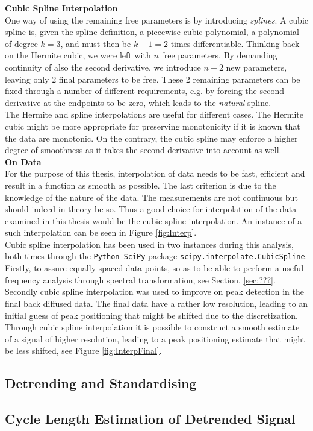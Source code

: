 \documentclass[../../CompleteThesis/Complete_1stDraft]{subfiles}
\begin{document}
\indent \textbf{Cubic Spline Interpolation}\\
One way of using the remaining free parameters is by introducing \textit{splines}. A cubic spline is, given the spline definition, a piecewise cubic polynomial, a polynomial of degree $k=3$, and must then be $k-1 = 2$ times differentiable. Thinking back on the Hermite cubic, we were left with $n$ free parameters. By demanding continuity of also the second derivative, we introduce $n-2$ new parameters, leaving only 2 final parameters to be free. These 2 remaining parameters can be fixed through a number of different requirements, e.g. by forcing the second derivative at the endpoints to be zero, which leads to the \textit{natural} spline.\\
The Hermite and spline interpolations are useful for different cases. The Hermite cubic might be more appropriate for preserving monotonicity if it is known that the data are monotonic. On the contrary, the cubic spline may enforce a higher degree of smoothness as it takes the second derivative into account as well.\\
\indent \textbf{On Data}\\
For the purpose of this thesis, interpolation of data needs to be fast, efficient and result in a function as smooth as possible. The last criterion is due to the knowledge of the nature of the data. The measurements are not continuous but should indeed in theory be so. Thus a good choice for interpolation of the data examined in this thesis would be the cubic spline interpolation. An instance of a such interpolation can be seen in Figure \ref{fig:Interp}.\\
Cubic spline interpolation has been used in two instances during this analysis, both times through the \lstinline[language=Python]|Python SciPy| package \lstinline[language=Python]|scipy.interpolate.CubicSpline|. Firstly, to assure equally spaced data points, so as to be able to perform a useful frequency analysis through spectral transformation, see Section, \ref{sec:???}. Secondly cubic spline interpolation was used to improve on peak detection in the final back diffused data. The final data have a rather low resolution, leading to an initial guess of peak positioning that might be shifted due to the discretization. Through cubic spline interpolation it is possible to construct a smooth estimate of a signal of higher resolution, leading to a peak positioning estimate that might be less shifted, see Figure \ref{fig:InterpFinal}.

\subsection[Standardisation]{Detrending and Standardising}
\subsection[Cycle Length Estimation][Cycle Length Estimation]{Cycle Length Estimation of Detrended Signal}

	
	
\end{document}

